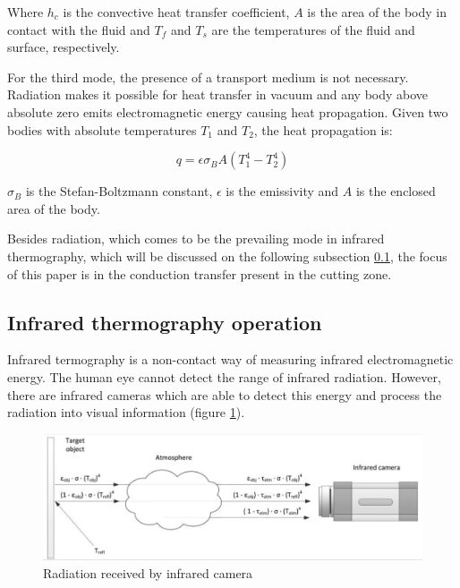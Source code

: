 	Where $h_{c}$ is the convective heat transfer coefficient, $A$ is the area of the body in contact with the fluid and $T_{f}$ and $T_{s}$ are the temperatures of the fluid and surface, respectively.

	For the third mode, the presence of a transport medium is not necessary. Radiation makes it possible for heat transfer in vacuum and any body above absolute zero emits electromagnetic energy causing heat propagation. Given two bodies with absolute temperatures $T_{1}$ and $T_{2}$, the heat propagation is:

	\begin{equation} 
	\label{}
	q = \epsilon \sigma_{B}A(T_{1}^{4} - T_{2}^{4})
	\end{equation}

	$\sigma_{B}$ is the Stefan-Boltzmann constant, $\epsilon$ is the emissivity and $A$ is the enclosed area of the body.

	Besides radiation, which comes to be the prevailing mode in infrared thermography, which will be discussed on the following subsection \ref{subsec:infraOp}, the focus of this paper is in the conduction transfer present in the cutting zone.

	\subsection{Infrared thermography operation}
	\label{subsec:infraOp}

	Infrared termography is a non-contact way of measuring infrared electromagnetic energy. The human eye cannot detect the range of infrared radiation. However, there are infrared cameras which are able to detect this energy and process the radiation into visual information (figure \ref{fig:thermog}).

	\begin{figure}[H]
		\centering
		\captionsetup{justification=centering}
		\includegraphics[scale=0.5]{Imagens/thermography.png}
		\caption{Radiation received by infrared camera \cite{usamentiaga2014}}
		\label{fig:thermog}
	\end{figure}

